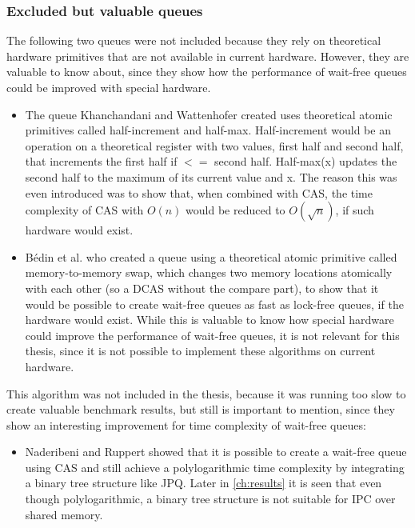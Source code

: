 \subsubsection{Excluded but valuable queues}
The following two queues were not included because they rely on theoretical hardware primitives that are not available in current hardware. However, they are valuable to know about, since they show how the performance of wait-free queues could be improved with special hardware.
\begin{itemize}
    \item The queue Khanchandani and Wattenhofer \cite{halfincrementhalfmax} created uses theoretical atomic primitives called half-increment and half-max. Half-increment would be an operation on a theoretical register with two values, first half and second half, that increments the first half if $<=$ second half. Half-max(x) updates the second half to the maximum of its current value and x. The reason this was even introduced was to show that, when combined with \ac{CAS}, the time complexity of \ac{CAS} with $O(n)$ would be reduced to $O(\sqrt{n})$, if such hardware would exist.
    \item Bédin et al. \cite{memorytomemory} who created a queue using a theoretical atomic primitive called memory-to-memory swap, which changes two memory locations atomically with each other (so a \ac{DCAS} without the compare part), to show that it would be possible to create wait-free queues as fast as lock-free queues, if the hardware would exist. While this is valuable to know how special hardware could improve the performance of wait-free queues, it is not relevant for this thesis, since it is not possible to implement these algorithms on current hardware.
\end{itemize}
This algorithm was not included in the thesis, because it was running too slow to create valuable benchmark results, but still is important to mention, since they show an interesting improvement for time complexity of wait-free queues:
\begin{itemize}
    \item Naderibeni and Ruppert \cite{polylog} showed that it is possible to create a wait-free queue using \ac{CAS} and still achieve a polylogarithmic time complexity by integrating a binary tree structure like \ac{JPQ}. Later in \cref{ch:results} it is seen that even though polylogarithmic, a binary tree structure is not suitable for \ac{IPC} over shared memory.
\end{itemize}